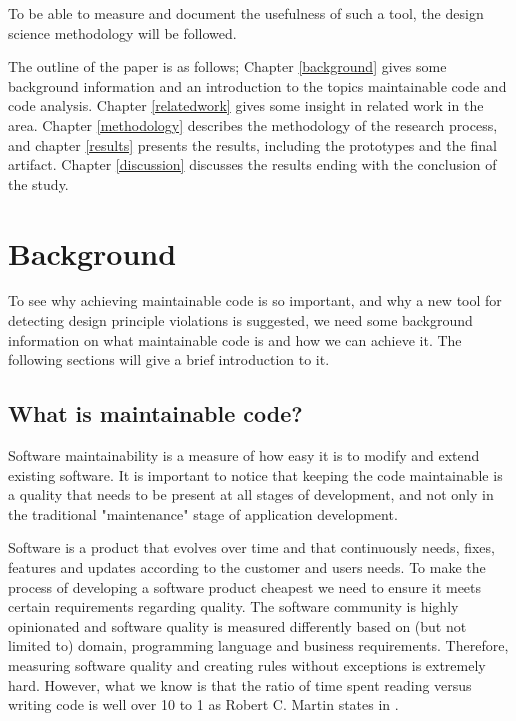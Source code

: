 \documentclass{report}
\begin{document}
To be able to measure and document the usefulness of such a tool, the design science methodology will be followed.


The outline of the paper is as follows; Chapter \ref{background} gives some background information and an introduction to the topics maintainable code and code analysis. Chapter \ref{relatedwork} gives some insight in related work in the area. Chapter \ref{methodology} describes the methodology of the research process, and chapter \ref{results} presents the results, including the prototypes and the final artifact. Chapter \ref{discussion} discusses the results ending with the conclusion of the study.  

\chapter{Background}

\label{background}
To see why achieving maintainable code is so important, and why a new tool for detecting design principle violations is suggested, we need some background information on what maintainable code is and how we can achieve it. The following sections will give a brief introduction to it.

\section{What is maintainable code?}
Software maintainability is a measure of how easy it is to modify and extend existing software. It is important to notice that keeping the code maintainable is a quality that needs to be present at all stages of development, and not only in the traditional "maintenance" stage of application development.  

Software is a product that evolves over time and that continuously needs, fixes, features and updates according to the customer and users needs. To make the process of developing a software product cheapest we need to ensure it meets certain requirements regarding quality. The software community is highly opinionated and software quality is measured differently based on (but not limited to) domain, programming language and business requirements. Therefore, measuring software quality and creating rules without exceptions is extremely hard. However, what we know is that the ratio of time spent reading versus writing code is well over 10 to 1 as Robert C. Martin states in \cite{Martin:2008:CCH:1388398}.
\end{document}
